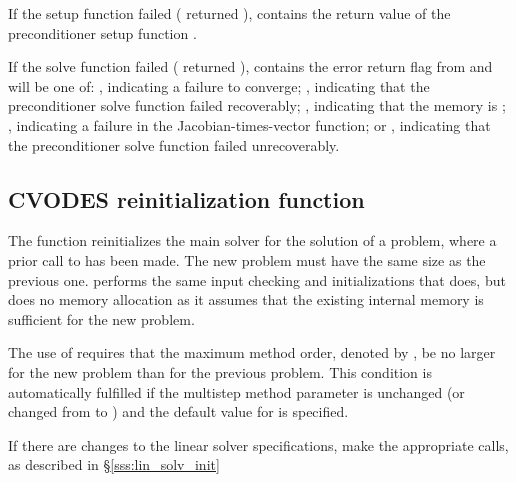 {
  If the {\cvsptfqmr} setup function failed ( returned
  ),  contains the return value of the
  preconditioner setup function .

  If the {\cvsptfqmr} solve function failed ( returned
  ),  contains the error return flag from
   and will be one of:
 , indicating a failure to converge;
 , indicating that the preconditioner solve function
  failed recoverably;
  , indicating that the {\sptfqmr} memory is ;
  , indicating a failure in the Jacobian-times-vector
  function; or
  , indicating that the preconditioner solve
  function  failed unrecoverably.
}

\subsection{CVODES reinitialization function}\label{sss:cvreinit}

The function  reinitializes the main {\cvodes} solver for
the solution of a problem, where a prior call to  has
been made. The new problem must have the same size as the previous one.
 performs the same input checking and initializations 
that  does, but does no memory allocation as it assumes that the 
existing internal memory is sufficient for the new problem.             
                                                                 
The use of  requires that the maximum method order, denoted by 
, be no larger for the new problem than for the previous problem.
This condition is  
automatically fulfilled if the multistep method parameter   
is unchanged (or changed from  to ) and the default    
value for  is specified.

If there are changes to the linear solver specifications, make the
appropriate  calls, as described in \S\ref{sss:lin_solv_init}


